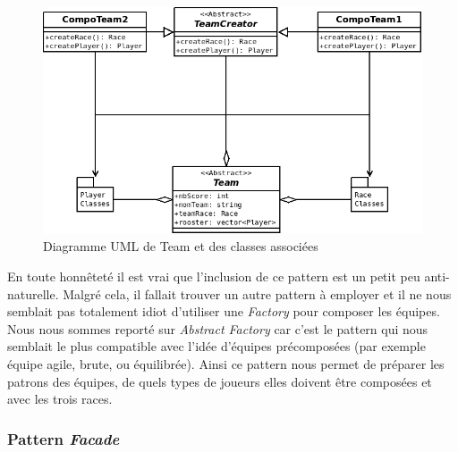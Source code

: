 \documentclass{article}
\newcommand{\pattern}{\emph}
\begin{document}
            \begin{figure}[H]
                \centerline{\includegraphics[scale=0.5]{img/Team.png}}
                \caption{\label{DiaTeam} Diagramme UML de Team et des classes associées}
            \end{figure}
        
            En toute honnêteté il est vrai que l'inclusion de ce pattern est un petit peu anti-naturelle. Malgré cela, il fallait trouver un autre pattern à employer et il ne nous semblait pas totalement idiot d'utiliser une \pattern{Factory} pour composer les équipes. Nous nous sommes reporté sur \pattern{Abstract Factory} car c'est le pattern qui nous semblait le plus compatible avec l'idée d'équipes précomposées (par exemple équipe agile, brute, ou équilibrée). Ainsi ce pattern nous permet de préparer les patrons des équipes, de quels types de joueurs elles doivent être composées et avec les trois races.
            
        \subsubsection{Pattern \pattern{Facade}}
            
\end{document}
